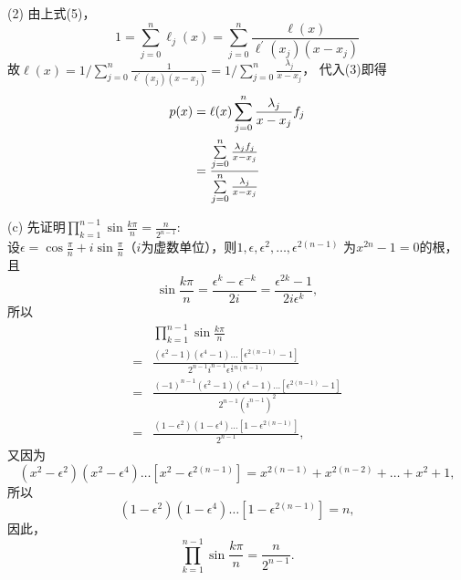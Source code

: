 \documentclass[12pt,a4paper,utf8]{ctexart}
\begin{document}
\begin{enumerate}
\subsubitem(2)
由上式(5)，
\begin{equation}
   1 = \sum_{j = 0}^n \ell_j(x) = \sum_{j = 0}^n \frac{\ell(x)}{\ell^{'}(x_j)(x-x_j)}
\end{equation}
故$\ell(x) = {1} / {\sum_{j = 0}^n \frac{1}{\ell^{'}(x_j)(x-x_j)}} = {1} / {\sum_{j = 0}^n \frac{\lambda_j}{x - x_j}}$，
代入(3)即得
\begin{equation}
   \begin{aligned}
      p(x) &= \ell(x) \sum_{j = 0}^n \frac{\lambda_j}{x - x_j} f_j\\
      &= \frac{\sum_{j = 0}^n\limits \frac{\lambda_j f_j}{x - x_j}}{\sum_{j = 0}^n\limits \frac{\lambda_j}{x - x_j}}
   \end{aligned}
\end{equation}

\subitem(c)
先证明$\prod\limits_{k=1}^{n-1}\sin\frac{k\pi}{n}=\frac{n}{2^{n-1}}$:\\
设$\epsilon=\cos\frac{\pi}{n}+i\sin\frac{\pi}{n}$（$i$为虚数单位），则$1,\epsilon,\epsilon^2,\ldots,\epsilon^{2(n-1)}$
为$x^{2n}-1=0$的根，且
\begin{equation}
   \sin\frac{k\pi}{n}=\frac{\epsilon^k-\epsilon^{-k}}{2i}=\frac{\epsilon^{2k}-1}{2i\epsilon^k},
\end{equation}
所以
\begin{equation}
   \begin{aligned}
      {}&\prod_{k=1}^{n-1}\sin\frac{k\pi}{n}\\
      =&\frac{(\epsilon^{2}-1) (\epsilon^{4}-1) \ldots [\epsilon^{2(n-1)}-1]}{2^{n-1}i^{n-1}\epsilon^{\frac{1}{2} n(n-1)}}\\
      =&\frac{(-1)^{n-1}(\epsilon^2-1)(\epsilon^4-1)\ldots[\epsilon^{2(n-1)}-1]}{2^{n-1}(i^{n-1})^2}\\
      =&\frac{(1-\epsilon^2)(1-\epsilon^4)\ldots[1-\epsilon^{2(n-1)}]}{2^{n-1}},
   \end{aligned}
\end{equation}
又因为
\begin{equation}
   (x^2-\epsilon^2)(x^2-\epsilon^4)\ldots[x^2-\epsilon^{2(n-1)}]=x^{2(n-1)}+x^{2(n-2)}+\ldots+x^{2}+1,
\end{equation}
所以
\begin{equation}
   (1-\epsilon^2)(1-\epsilon^4)\ldots[1-\epsilon^{2(n-1)}]=n,	
\end{equation}
因此，
\begin{equation}
   \prod_{k=1}^{n-1}\sin\frac{k\pi}{n}=\frac{n}{2^{n-1}}.
\end{equation}

\end{enumerate}
\end{document}
